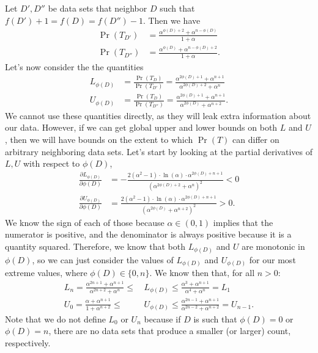 \documentclass[11pt]{scrartcl} %
\begin{document}
Let $D', D''$ be data sets that neighbor $D$ such that $f(D') + 1 = f(D) = f(D'') - 1$. Then we have
\begin{align*}
    \Pr(T_{D'}) &= \frac{\alpha^{\phi(D) + 2} + \alpha^{n-\phi(D)}}{1+\alpha} \\
    \Pr(T_{D''}) &= \frac{\alpha^{\phi(D)} + \alpha^{n-\phi(D)+2}}{1+\alpha}.
\end{align*}
Let's now consider the the quantities
\begin{align}
    \label{eq:L_U}
    L_{\phi(D)} &= \frac{\Pr(T_D)}{\Pr(T_{D'})} = \frac{\alpha^{2 \phi(D) + 1} + \alpha^{n+1}}{\alpha^{2 \phi(D) + 2} + \alpha^{n}} \\
    U_{\phi(D)} &= \frac{\Pr(T_D)}{\Pr(T_{D''})} = \frac{\alpha^{2 \phi(D)+1} + \alpha^{n+1}}{\alpha^{2 \phi(D)} + \alpha^{n+2}}. \nonumber
\end{align}
We cannot use these quantities directly, as they will leak extra information about our data.
However, if we can get global upper and lower bounds on both $L$ and $U$,
then we will have bounds on the extent to which $\Pr(T)$ can differ on arbitrary neighboring data sets.
Let's start by looking at the partial derivatives of $L,U$ with respect to $\phi(D)$,
\begin{align*}
    \frac{\partial L_{\phi(D)}}{\partial \phi(D)} &= -\frac{2(\alpha^2-1) \cdot \ln(\alpha) \cdot \alpha^{2\phi(D)+n+1}}{(\alpha^{2\phi(D)+2}+\alpha^{n})^2} < 0 \\
    \frac{\partial U_{\phi(D)}}{\partial \phi(D)} &= \frac{2(\alpha^2-1) \cdot \ln(\alpha) \cdot \alpha^{2\phi(D)+n+1}}{(\alpha^{2\phi(D)}+\alpha^{n+2})^2} > 0.
\end{align*}
We know the sign of each of those because $\alpha \in (0,1)$ implies that the numerator is positive, and the denominator is
always positive because it is a quantity squared. Therefore, we know that both $L_{\phi(D)}$ and $U$ are monotonic in $\phi(D)$,
so we can just consider the values of $L_{\phi(D)}$ and $U_{\phi(D)}$ for our most extreme values, where $\phi(D) \in \{0, n\}$.
We know then that, for all $n > 0$:
\begin{align*}
    L_{n} = \frac{\alpha^{2n+1} + \alpha^{n+1}}{\alpha^{2n+2} + \alpha^n} \leq \hspace{2pt} &L_{\phi(D)} \leq \frac{\alpha^3 + \alpha^{n+1}}{\alpha^4 + \alpha^n} = L_{1} \\
    U_{0} = \frac{\alpha + \alpha^{n+1}}{1 + \alpha^{n+2}} \leq \hspace{2pt} &U_{\phi(D)} \leq \frac{\alpha^{2n-1} + \alpha^{n+1}}{\alpha^{2n-2} + \alpha^{n+2}} = U_{n-1}.
\end{align*}
Note that we do not define $L_0$ or $U_n$ because if $D$ is such that $\phi(D) = 0$ or $\phi(D) = n$, there are no
data sets that produce a smaller (or larger) count, respectively. \newline
\end{document}
